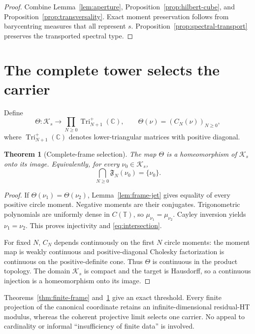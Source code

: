 \documentclass[11pt]{article}
\newtheorem{theorem}{Theorem}[section]
\newcommand{\C}{\mathbb C}
\newcommand{\T}{\mathbb T}
\newcommand{\cK}{\mathcal K}
\begin{document}
\begin{proof}
Combine Lemma~\ref{lem:aperture}, Proposition~\ref{prop:hilbert-cube}, and
Proposition~\ref{prop:transversality}.  Exact moment
preservation follows from barycentring measures that all represent $s$.
Proposition~\ref{prop:spectral-transport} preserves the transported spectral type.
\end{proof}

\section{The complete tower selects the carrier}\label{sec:selection}

Define
\begin{equation}\label{eq:theta}
  \Theta:\cK_s\longrightarrow\prod_{N\geq0}\operatorname{Tri}_{N+1}^{+}(\C),
  \qquad \Theta(\nu)=(C_N(\nu))_{N\geq0},
\end{equation}
where $\operatorname{Tri}_{N+1}^{+}(\C)$ denotes lower-triangular matrices with positive diagonal.

\begin{theorem}[Complete-frame selection]\label{thm:selection}
The map $\Theta$ is a homeomorphism of $\cK_s$ onto its image.  Equivalently, for every
$\nu_0\in\cK_s$,
\begin{equation}\label{eq:intersection}
  \bigcap_{N\geq0}\mathfrak F_N(\nu_0)=\{\nu_0\}.
\end{equation}
\end{theorem}

\begin{proof}
If $\Theta(\nu_1)=\Theta(\nu_2)$, Lemma~\ref{lem:frame-jet} gives equality of every positive
circle moment.  Negative moments are their conjugates.  Trigonometric polynomials are uniformly
dense in $C(\T)$, so $\mu_{\nu_1}=\mu_{\nu_2}$.  Cayley inversion yields
$\nu_1=\nu_2$.  This proves injectivity and \eqref{eq:intersection}.

For fixed $N$, $C_N$ depends continuously on the first $N$ circle moments: the moment map is weakly
continuous and positive-diagonal Cholesky factorization is continuous on the positive-definite
cone.  Thus $\Theta$ is continuous in the product topology.  The domain $\cK_s$ is compact and
the target is Hausdorff, so a continuous injection is a homeomorphism onto its image.
\end{proof}

Theorems~\ref{thm:finite-frame} and~\ref{thm:selection} give an exact threshold.  Every finite
projection of the canonical coordinate retains an infinite-dimensional residual-HT modulus,
whereas the coherent projective limit selects one carrier.  No appeal to cardinality or informal
``insufficiency of finite data'' is involved.
\end{document}
